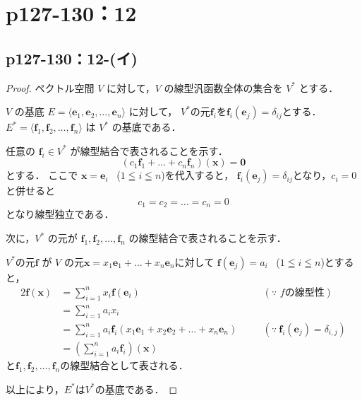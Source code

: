 \documentclass[a4paper,10pt,fleqn]{ltjsarticle}
\begin{document}
\newpage


\section*{p127-130：12}


\subsection*{p127-130：12-(イ)}


\begin{tleftbar}
    \begin{proof}
        ペクトル空間 $V$ に対して，$V$ の線型汎函数全体の集合を $V^*$ とする．

        $V$ の基底 $E= \langle \bm{e}_1, \bm{e}_2, \dots, \bm{e}_n\rangle $ に対して，
        $V^*$の元$\bm{f}_i$を$\bm{f}_i(\bm{e}_j)=\delta_{ij}$とする．
        $E^* = \langle \bm{f}_1, \bm{f}_2, \dots, \bm{f}_n\rangle$ は $V^*$ の基底である．

        任意の $\bm{f}_i  \in V^*$ が線型結合で表されることを示す．
        \[
            (c_1 \bm{f}_1 + \dots + c_n \bm{f}_n) (\bm{x}) = \bm{0}
        \]
        とする．
        ここで $\bm{x} = \bm{e}_i$ ~($1 \leqq i \leqq n$)を代入すると，
        $\bm{f}_i (\bm{e}_j) = \delta_{ij}$となり，$c_i =0$と併せると
        \[
            c_1=c_2 = \dots =c_n = 0
        \]
        となり線型独立である．

        次に，$V^\ast$ の元が $\bm{f}_1, \bm{f}_2, \dots, \bm{f}_n$ の線型結合で表されることを示す．

        $V^\ast$の元$\bm{f}$ が $V$ の元$\bm{x}=x_1 \bm{e}_1 + \dots + x_n \bm{e}_n$に対して
        $\bm{f}(\bm{e}_j) = a_i$~ ($1 \leqq i \leqq n$)とすると，
        \begin{alignat*}{2}
            \bm{f} (\bm{x}) & = \sum_{i=1}^{n} x_i \bm{f}(\bm{e}_i)                                            & \quad & (\text{$\because$~$f$の線型性})                           \\
                            & = \sum_{i=1}^{n} a_i x_i                                                         &       &                                                       \\
                            & = \sum_{i=1}^{n} a_i \bm{f}_i (x_1 \bm{e}_1 + x_2 \bm{e}_2 +\dots+ x_n \bm{e}_n) & \quad & (\text{$\because~ \bm{f}_i (\bm{e}_j)=\delta_{i,j}$}) \\
                            & = \left( \sum_{i=1}^{n} a_i \bm{f}_i \right) (\bm{x})                            &       &
        \end{alignat*}
        と$\bm{f}_1 , \bm{f}_2 , \dots ,\bm{f}_n$の線型結合として表される．

        以上により，$E^\ast$は$V^\ast$の基底である．
    \end{proof}
\end{tleftbar}
\newpage
\end{document}
